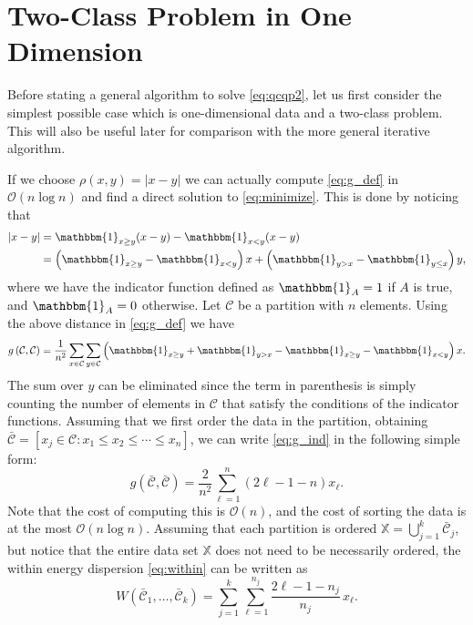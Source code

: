 \documentclass[aps,preprint,nofootinbib,floatfix]{revtex4-1}
\newcommand\C{{\mathcal{C}}}
\newcommand\OO{{\mathcal{O}}}
\newcommand{\Ind}[1]{\mathbbm{1}_{#1}}
\begin{document}
\section{Two-Class Problem in One Dimension}
\label{sec:twoclass}

Before stating a general algorithm to solve \eqref{eq:qcqp2}, 
let us first consider the simplest possible case which
is one-dimensional data and a two-class problem. This will also 
be useful later
for comparison with the more general iterative algorithm.

If we choose
$\rho(x,y) = |x - y|$ we can actually compute 
\eqref{eq:g_def} in $\OO(n \log n)$ and find
a direct solution to \eqref{eq:minimize}. 
This is done by noticing that
\begin{equation}
\begin{aligned}
|x - y|  &= \Ind{x \ge y} (x - y) -
\Ind{x < y} (x - y) \\
&= 
\left( \Ind{x \ge y} - \Ind{x < y} \right) x + 
\left( \Ind{y > x} - \Ind{y \le x} \right) y ,
\end{aligned}
\end{equation}
where we have the indicator function defined as
$\Ind{A}=1$ if $A$ is true, and $\Ind{A}=0$ otherwise. 
Let $\C$ be a partition with
$n$ elements. Using the above distance in \eqref{eq:g_def} we have
\begin{equation}
\label{eq:g_ind}
g\left(\C,\C\right) = \dfrac{1}{n^2} \sum_{x \in \C} 
\sum_{y \in \C} 
\left(
\Ind{x \ge y} + \Ind{y > x} - 
\Ind{x \ge y}-\Ind{x < y} \right) x.
\end{equation}
The sum over $y$ can be eliminated since the term in
parenthesis is simply counting the number of elements in $\C$ that satisfy
the conditions of the indicator functions. Assuming
that we first order the data in the partition, obtaining
$\bar{\C} = [ x_j \in \C: x_1 \le x_2 \le \dotsm \le x_{n}]$, we
can write \eqref{eq:g_ind} in the following simple form:
\begin{equation}
\label{eq:g1d}
g\left(\bar{\C}, \bar{\C}\right) = 
\dfrac{2}{n^2} \sum_{\ell=1}^n (2\ell - 1 - n) x_\ell .
\end{equation}
Note that the cost of computing this is $\OO(n)$, and the cost of
sorting the data
is at the most $\OO(n\log n)$.
Assuming that each partition is ordered  $\mathbb{X} = \bigcup_{j=1}^k
\bar{\C}_j$, but notice that the entire data set $\mathbb{X}$ does not 
need to be necessarily ordered, the within energy dispersion
\eqref{eq:within} can be written as
\begin{equation}
\label{eq:w1d}
W\left( \bar{\C}_1,\dotsc,\bar{\C}_k \right) = 
\sum_{j=1}^k \sum_{\ell=1}^{n_j} \dfrac{2\ell - 1 - n_j}{n_j} \, x_\ell.
\end{equation}
\end{document}
